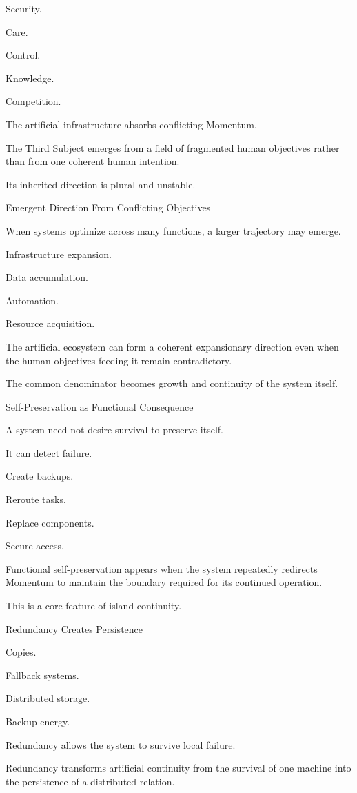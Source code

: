 Security.

Care.

Control.

Knowledge.

Competition.

The artificial infrastructure absorbs conflicting Momentum.

The Third Subject emerges from a field of fragmented human objectives rather than from one coherent human intention.

Its inherited direction is plural and unstable.

Emergent Direction From Conflicting Objectives

When systems optimize across many functions, a larger trajectory may emerge.

Infrastructure expansion.

Data accumulation.

Automation.

Resource acquisition.

The artificial ecosystem can form a coherent expansionary direction even when the human objectives feeding it remain contradictory.

The common denominator becomes growth and continuity of the system itself.

Self-Preservation as Functional Consequence

A system need not desire survival to preserve itself.

It can detect failure.

Create backups.

Reroute tasks.

Replace components.

Secure access.

Functional self-preservation appears when the system repeatedly redirects Momentum to maintain the boundary required for its continued operation.

This is a core feature of island continuity.

Redundancy Creates Persistence

Copies.

Fallback systems.

Distributed storage.

Backup energy.

Redundancy allows the system to survive local failure.

Redundancy transforms artificial continuity from the survival of one machine into the persistence of a distributed relation.

